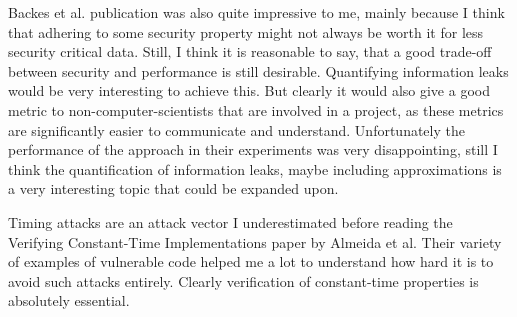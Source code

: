 \documentclass[a4paper,UKenglish]{lipics-v2018}
\begin{document}
Backes et al. publication was also quite impressive to me, mainly because I think that adhering to some security property might not always be worth it for less security critical data. Still, I think it is reasonable to say, that a good trade-off between security and performance is still desirable. Quantifying information leaks would be very interesting to achieve this. But clearly it would also give a good metric to non-computer-scientists that are involved in a project, as these metrics are significantly easier to communicate and understand. Unfortunately the performance of the approach in their experiments was very disappointing, still I think the quantification of information leaks, maybe including approximations is a very interesting topic that could be expanded upon.

Timing attacks are an attack vector I underestimated before reading the Verifying Constant-Time Implementations paper by Almeida et al.\cite{verifying_constant_time_implementations} Their variety of examples of vulnerable code helped me a lot to understand how hard it is to avoid such attacks entirely. Clearly verification of constant-time properties is absolutely essential.
\end{document}
